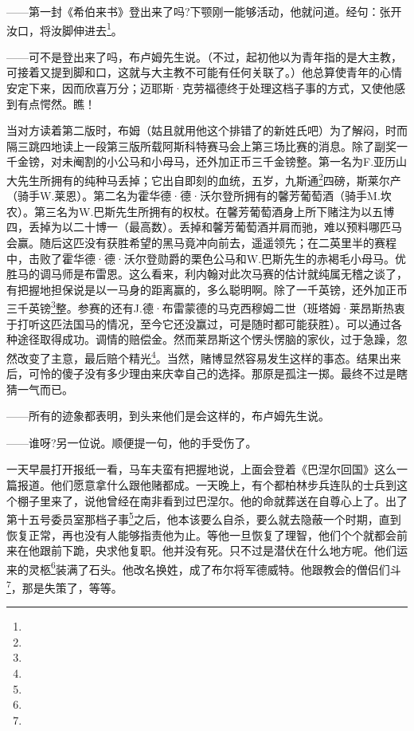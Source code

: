 \par ——第一封《希伯来书》登出来了吗?下颚刚一能够活动，他就问道。经句：张开汝口，将汝脚伸进去\footnote{}。
\par ——可不是登出来了吗，布卢姆先生说。（不过，起初他以为青年指的是大主教，可接着又提到脚和口，这就与大主教不可能有任何关联了。）他总算使青年的心情安定下来，因而欣喜万分；迈耶斯·克劳福德终于处理这档子事的方式，又使他感到有点愕然。瞧！
\par 当对方读着第二版时，布姆（姑且就用他这个排错了的新姓氏吧）为了解闷，时而隔三跳四地读上一段第三版所载阿斯科特赛马会上第三场比赛的消息。除了副奖一千金镑，对未阉割的小公马和小母马，还外加正币三千金镑整。第一名为F.亚历山大先生所拥有的纯种马丢掉；它出自即刻的血统，五岁，九斯通\footnote{}四磅，斯莱尔产（骑手W.莱恩）。第二名为霍华德·德·沃尔登所拥有的馨芳葡萄酒（骑手M.坎农）。第三名为W.巴斯先生所拥有的权杖。在馨芳葡萄酒身上所下赌注为以五博四，丢掉为以二十博一（最高数）。丢掉和馨芳葡萄酒并肩而驰，难以预料哪匹马会赢。随后这匹没有获胜希望的黑马竟冲向前去，遥遥领先；在二英里半的赛程中，击败了霍华德·德·沃尔登勋爵的栗色公马和W.巴斯先生的赤褐毛小母马。优胜马的调马师是布雷恩。这么看来，利内翰对此次马赛的估计就纯属无稽之谈了，有把握地担保说是以一马身的距离赢的，多么聪明啊。除了一千英镑，还外加正币三千英镑\footnote{}整。参赛的还有J.德·布雷蒙德的马克西穆姆二世（班塔姆·莱昂斯热衷于打听这匹法国马的情况，至今它还没赢过，可是随时都可能获胜）。可以通过各种途径取得成功。调情的赔偿金。然而莱昂斯这个愣头愣脑的家伙，过于急躁，忽然改变了主意，最后赔个精光\footnote{}。当然，赌博显然容易发生这样的事态。结果出来后，可怜的傻子没有多少理由来庆幸自己的选择。那原是孤注一掷。最终不过是瞎猜一气而已。
\par ——所有的迹象都表明，到头来他们是会这样的，布卢姆先生说。
\par ——谁呀?另一位说。顺便提一句，他的手受伤了。
\par 一天早晨打开报纸一看，马车夫蛮有把握地说，上面会登着《巴涅尔回国》这么一篇报道。他们愿意拿什么跟他赌都成。一天晚上，有个都柏林步兵连队的士兵到这个棚子里来了，说他曾经在南非看到过巴涅尔。他的命就葬送在自尊心上了。出了第十五号委员室那档子事\footnote{}之后，他本该要么自杀，要么就去隐蔽一个时期，直到恢复正常，再也没有人能够指责他为止。等他一旦恢复了理智，他们个个就都会前来在他跟前下跪，央求他复职。他并没有死。只不过是潜伏在什么地方呢。他们运来的灵柩\footnote{}装满了石头。他改名换姓，成了布尔将军德威特。他跟教会的僧侣们斗\footnote{}，那是失策了，等等。
